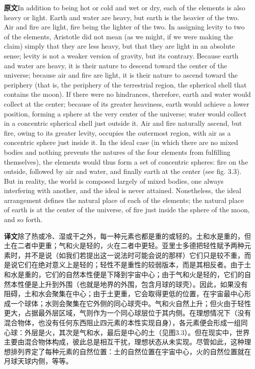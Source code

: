 \documentclass[UTF8,zihao=-4]{ctexart}
\newcommand{\BodyFont}{\fontsize{10.5pt}{15.5pt}\selectfont}
\newcommand{\origlabel}{\textbf{原文}\quad}
\newcommand{\translabel}{\textbf{译文}\quad}
\newcommand{\orig}{\par\noindent\begingroup\BodyFont\origlabel}
\newcommand{\zhline}[1]{\par\endgroup\noindent\begingroup\BodyFont\translabel #1\par\endgroup\vspace{0.35em}}
\begin{document}
\orig In addition to being hot or cold and wet or dry, each of the elements is also heavy or light. Earth and water are heavy, but earth is the heavier of the two. Air and fire are light, fire being the lighter of the two. In assigning levity to two of the elements, Aristotle did not mean (as we might, if we were making the claim) simply that they are less heavy, but that they are light in an absolute sense; levity is not a weaker version of gravity, but its contrary. Because earth and water are heavy, it is their nature to descend toward the center of the universe; because air and fire are light, it is their nature to ascend toward the periphery (that is, the periphery of the terrestrial region, the spherical shell that contains the moon). If there were no hindrances, therefore, earth and water would collect at the center; because of its greater heaviness, earth would achieve a lower position, forming a sphere at the very center of the universe; water would collect in a concentric spherical shell just outside it. Air and fire naturally ascend, but fire, owing to its greater levity, occupies the outermost region, with air as a concentric sphere just inside it. In the ideal case (in which there are no mixed bodies and nothing prevents the natures of the four elements from fulfilling themselves), the elements would thus form a set of concentric spheres: fire on the outside, followed by air and water, and finally earth at the center (see fig. 3.3). But in reality, the world is composed largely of mixed bodies, one always interfering with another, and the ideal is never attained. Nonetheless, the ideal arrangement defines the natural place of each of the elements; the natural place of earth is at the center of the universe, of fire just inside the sphere of the moon, and so forth.

\zhline{除了热或冷、湿或干之外，每一种元素也都是重的或轻的。土和水是重的，但土在二者中更重；气和火是轻的，火在二者中更轻。亚里士多德把轻性赋予两种元素时，并不是说（如我们若提出这一说法时可能会说的那样）它们只是较不重，而是说它们在绝对意义上是轻的；轻性不是重性的较弱版本，而是其相反者。由于土和水是重的，它们的自然本性便是下降到宇宙中心；由于气和火是轻的，它们的自然本性便是上升到外围（也就是地界的外围，包含月球的球壳）。因此，如果没有阻碍，土和水会聚集在中心；由于土更重，它会取得更低的位置，在宇宙最中心形成一个球体；水则会聚集在它外侧的同心球壳中。气和火自然上升；但火由于轻性更大，占据最外层区域，气则作为一个同心球层位于其内侧。在理想情况下（没有混合物体，也没有任何东西阻止四元素的本性实现自身），各元素便会形成一组同心球：外层是火，其次是气和水，最后是中心的土（见图3.3）。但在现实中，世界主要由混合物体构成，彼此总是相互干扰，理想状态从未实现。尽管如此，这种理想排列界定了每种元素的自然位置：土的自然位置在宇宙中心，火的自然位置就在月球天球内侧，等等。}
\end{document}
